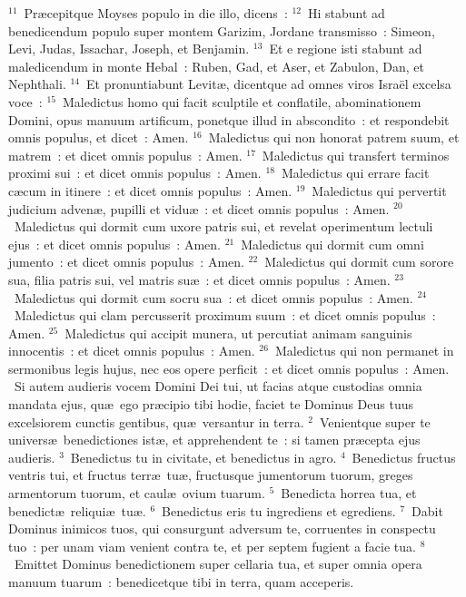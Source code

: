 ${}^{11}$~Pr\ae cepitque Moyses populo in die illo, dicens~:
${}^{12}$~Hi stabunt ad benedicendum populo super montem Garizim, Jordane transmisso~: Simeon, Levi, Judas, Issachar, Joseph, et Benjamin.
${}^{13}$~Et e regione isti stabunt ad maledicendum in monte Hebal~: Ruben, Gad, et Aser, et Zabulon, Dan, et Nephthali.
${}^{14}$~Et pronuntiabunt Levit\ae , dicentque ad omnes viros Isra\"el excelsa voce~:
${}^{15}$~Maledictus homo qui facit sculptile et conflatile, abominationem Domini, opus manuum artificum, ponetque illud in abscondito~: et respondebit omnis populus, et dicet~: Amen.
${}^{16}$~Maledictus qui non honorat patrem suum, et matrem~: et dicet omnis populus~: Amen.
${}^{17}$~Maledictus qui transfert terminos proximi sui~: et dicet omnis populus~: Amen.
${}^{18}$~Maledictus qui errare facit c\ae cum in itinere~: et dicet omnis populus~: Amen.
${}^{19}$~Maledictus qui pervertit judicium adven\ae , pupilli et vidu\ae~: et dicet omnis populus~: Amen.
${}^{20}$~Maledictus qui dormit cum uxore patris sui, et revelat operimentum lectuli ejus~: et dicet omnis populus~: Amen.
${}^{21}$~Maledictus qui dormit cum omni jumento~: et dicet omnis populus~: Amen.
${}^{22}$~Maledictus qui dormit cum sorore sua, filia patris sui, vel matris su\ae~: et dicet omnis populus~: Amen.
${}^{23}$~Maledictus qui dormit cum socru sua~: et dicet omnis populus~: Amen.
${}^{24}$~Maledictus qui clam percusserit proximum suum~: et dicet omnis populus~: Amen.
${}^{25}$~Maledictus qui accipit munera, ut percutiat animam sanguinis innocentis~: et dicet omnis populus~: Amen.
${}^{26}$~Maledictus qui non permanet in sermonibus legis hujus, nec eos opere perficit~: et dicet omnis populus~: Amen.
~Si autem audieris vocem Domini Dei tui, ut facias atque custodias omnia mandata ejus, qu\ae\ ego pr\ae cipio tibi hodie, faciet te Dominus Deus tuus excelsiorem cunctis gentibus, qu\ae\ versantur in terra.
${}^{2}$~Venientque super te univers\ae\ benedictiones ist\ae , et apprehendent te~: si tamen pr\ae cepta ejus audieris.
${}^{3}$~Benedictus tu in civitate, et benedictus in agro.
${}^{4}$~Benedictus fructus ventris tui, et fructus terr\ae\ tu\ae , fructusque jumentorum tuorum, greges armentorum tuorum, et caul\ae\ ovium tuarum.
${}^{5}$~Benedicta horrea tua, et benedict\ae\ reliqui\ae\ tu\ae .
${}^{6}$~Benedictus eris tu ingrediens et egrediens.
${}^{7}$~Dabit Dominus inimicos tuos, qui consurgunt adversum te, corruentes in conspectu tuo~: per unam viam venient contra te, et per septem fugient a facie tua.
${}^{8}$~Emittet Dominus benedictionem super cellaria tua, et super omnia opera manuum tuarum~: benedicetque tibi in terra, quam acceperis.
